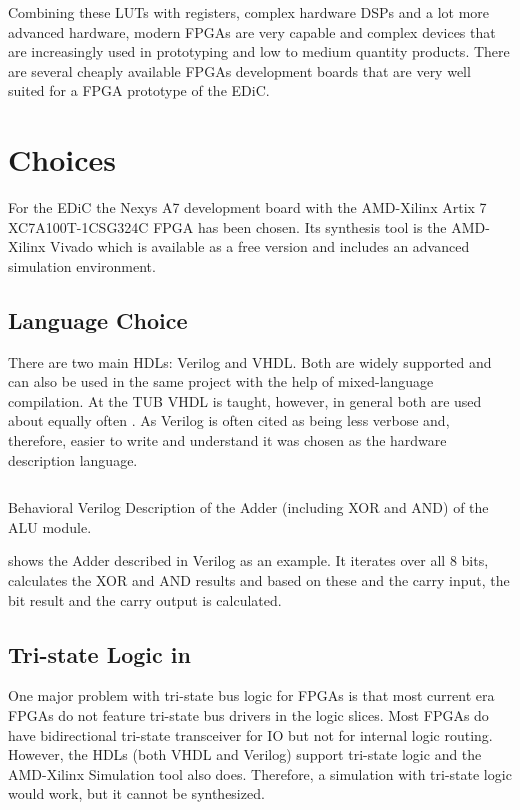 Combining these \glspl{LUT} with registers, complex hardware \glspl{DSP} and a lot more advanced hardware, modern \glspl{FPGA} are very capable and complex devices that are increasingly used in prototyping and low to medium quantity products.
There are several cheaply available \glspl{FPGA} development boards that are very well suited for a \gls{FPGA} prototype of the \gls{EDiC}.

\section{ Choices}
For the \gls{EDiC} the Nexys A7 development board \cite{nexysA7} with the AMD-Xilinx Artix 7 XC7A100T-1CSG324C \gls{FPGA} has been chosen.
Its synthesis tool is the AMD-Xilinx Vivado \cite{vivado} which is available as a free version and includes an advanced simulation environment.

\subsection{Language Choice}
There are two main \glspl{HDL}: Verilog and \gls{VHDL}.
Both are widely supported and can also be used in the same project with the help of mixed-language compilation.
At the \gls{TUB} \gls{VHDL} is taught, however, in general both are used about equally often \cite{vhdlVerilog}.
As Verilog is often cited as being less verbose and, therefore, easier to write and understand it was chosen as the hardware description language.

\begin{listing}
  \inputminted[linenos,
    breaklines,
    firstline=65,
    lastline=71,
    frame=leftline,
    xleftmargin=20pt,
  ]{verilog}{src/alu.v}
  \caption{Behavioral Verilog Description of the Adder (including XOR and AND) of the \gls{ALU} module.}
  \label{lst:alu}
\end{listing}
 shows the Adder described in Verilog as an example.
It iterates over all 8 bits, calculates the XOR and AND results and based on these and the carry input, the bit result and the carry output is calculated.

\subsection{Tri-state Logic in }
One major problem with tri-state bus logic for \glspl{FPGA} is that most current era \glspl{FPGA} do not feature tri-state bus drivers in the logic slices.
Most \glspl{FPGA} do have bidirectional tri-state transceiver for \gls{IO} but not for internal logic routing.
However, the \glspl{HDL} (both \gls{VHDL} and Verilog) support tri-state logic and the AMD-Xilinx Simulation tool also does.
Therefore, a simulation with tri-state logic would work, but it cannot be synthesized.

